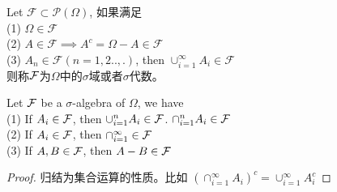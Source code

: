 \documentclass[11pt,fleqn]{book} %
\begin{document}
\begin{CJK}{UTF8}{gkai}
\begin{definition}
      Let $\mathcal{F} \subset \mathcal{P}(\Omega)$, 如果满足 \\
    (1) $\Omega \in \mathcal{F}$ \\
    (2) $A \in \mathcal{F} \implies A^c = \Omega - A \in \mathcal{F}$ \\
    (3) $A_n \in \mathcal{F}(n = 1, 2..,.)$, then $\cup_{i = 1}^{\infty} A_i \in \mathcal{F} $ \\
    则称$\mathcal{F}$为$\Omega$中的$\sigma$域或者$\sigma$代数。
\end{definition}
\begin{property}
    Let $\mathcal{F}$ be a $\sigma$-algebra of $\Omega$, we have \\
    (1) If $A_i \in \mathcal{F}$, then $\cup_{i = 1}^n A_i \in \mathcal{F}$. $\cap_{i = 1}^n A_i \in \mathcal{F}$ \\
    (2) If $A_i \in \mathcal{F}$, then $\cap_{i = 1}^{\infty} \in \mathcal{F}$\\
    (3) If $A, B \in \mathcal{F}$, then $A - B \in \mathcal{F}$ 
\end{property}
\begin{proof}
    归结为集合运算的性质。比如 $\left(\cap_{i = 1}^{\infty}A_i\right)^c = \cup_{i=1}^\infty A_i^c $
\end{proof}



\end{CJK}
\end{document}
